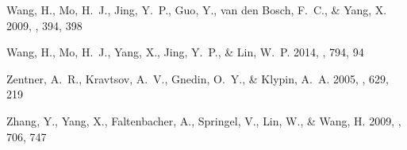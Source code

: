 \documentclass{emulateapj}
\begin{document}
\begin{thebibliography}{48}
{Wang}, H., {Mo}, H.~J., {Jing}, Y.~P., {Guo}, Y., {van den Bosch}, F.~C., \&
  {Yang}, X. 2009, \mnras, 394, 398

{Wang}, H., {Mo}, H.~J., {Yang}, X., {Jing}, Y.~P., \& {Lin}, W.~P. 2014, \apj,
  794, 94

{Zentner}, A.~R., {Kravtsov}, A.~V., {Gnedin}, O.~Y., \& {Klypin}, A.~A. 2005,
  \apj, 629, 219

{Zhang}, Y., {Yang}, X., {Faltenbacher}, A., {Springel}, V., {Lin}, W., \&
  {Wang}, H. 2009, \apj, 706, 747

\end{thebibliography}
\end{document}
